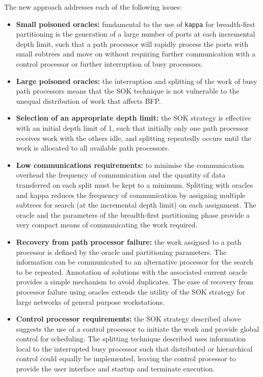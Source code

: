 \documentclass[a4paper,11pt,twoside]{article}
\begin{document}
The new approach addresses each of the following issues:
\begin{itemize}
\item{\textbf{Small poisoned oracles:} fundamental to the use of \texttt{kappa}
  for breadth-first partitioning is the generation of a large number of ports at
  each incremental depth limit, such that a path processor will rapidly process
  the ports with small subtrees and move on without requiring further communication
  with a control processor or further interruption of busy processors.}
\item{\textbf{Large poisoned oracles:} the interruption and splitting of the work of 
  busy path processors means that the SOK technique is not vulnerable to the
  unequal distribution of work that affects BFP.}
\item{\textbf{Selection of an appropriate depth limit:} the SOK strategy is effective
  with an initial depth limit of 1, such that initially only one path processor
  receives work with the others idle, and splitting repeatedly occurs until
  the work is allocated to all available path processors.}
\item{\textbf{Low communications requirements:} to minimise the communication
  overhead the frequency of communication and the quantity of data transferred
  on each split must be kept to a minimum.  Splitting with oracles and kappa
  reduces the frequency of communication by assigning multiple subtrees for
  search (at the incremental depth limit) on each assignment.  The oracle and
  the parameters of the breadth-first partitioning phase provide a very
  compact means of communicating the work required.}
\item{\textbf{Recovery from path processor failure:} the work assigned to a path
  processor is defined by the oracle and partitioning parameters.  The information
  can be communicated to an alternative processor for the search to be repeated.
  Annotation of solutions with the associated current oracle provides a simple
  mechanism to avoid duplicates.  The ease of recovery from
  processor failure using oracles extends the utility of the SOK strategy for
  large networks of general purpose workstations.}
\item{\textbf{Control processor requirements:} the SOK strategy described above
  suggests the use of a control processor to initiate the work and provide global
  control for scheduling.  The splitting technique described uses information local
  to the interrupted busy processor such that distributed or hierarchical
  control could equally be implemented, leaving the control processor to provide the
  user interface and startup and terminate execution.}
\end{itemize}
\end{document}
